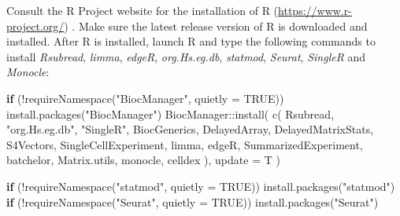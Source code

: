 \documentclass[
  openany]{book}
\newenvironment{Shaded}{\begin{snugshade}}{\end{snugshade}}
\newcommand{\AttributeTok}[1]{\textcolor[rgb]{0.77,0.63,0.00}{#1}}
\newcommand{\ConstantTok}[1]{\textcolor[rgb]{0.00,0.00,0.00}{#1}}
\newcommand{\ControlFlowTok}[1]{\textcolor[rgb]{0.13,0.29,0.53}{\textbf{#1}}}
\newcommand{\FunctionTok}[1]{\textcolor[rgb]{0.00,0.00,0.00}{#1}}
\newcommand{\NormalTok}[1]{#1}
\newcommand{\SpecialCharTok}[1]{\textcolor[rgb]{0.00,0.00,0.00}{#1}}
\newcommand{\StringTok}[1]{\textcolor[rgb]{0.31,0.60,0.02}{#1}}
\begin{document}
Consult the R Project website for the installation of R (\url{https://www.r-project.org/}) \citep{R-base}. Make sure the latest release version of R is downloaded and installed. After R is installed, launch R and type the following commands to install \emph{Rsubread}, \emph{limma}, \emph{edgeR}, \emph{org.Hs.eg.db}, \emph{statmod}, \emph{Seurat}, \emph{SingleR} and \emph{Monocle}:

\begin{Shaded}
\begin{Highlighting}[]
\ControlFlowTok{if}\NormalTok{ (}\SpecialCharTok{!}\FunctionTok{requireNamespace}\NormalTok{(}\StringTok{"BiocManager"}\NormalTok{, }\AttributeTok{quietly =} \ConstantTok{TRUE}\NormalTok{))}
  \FunctionTok{install.packages}\NormalTok{(}\StringTok{"BiocManager"}\NormalTok{)}
\NormalTok{BiocManager}\SpecialCharTok{::}\FunctionTok{install}\NormalTok{(}
  \FunctionTok{c}\NormalTok{(}
    \StringTok{\textquotesingle{}Rsubread\textquotesingle{}}\NormalTok{,}
    \StringTok{"org.Hs.eg.db"}\NormalTok{,}
    \StringTok{"SingleR"}\NormalTok{,}
    \StringTok{\textquotesingle{}BiocGenerics\textquotesingle{}}\NormalTok{,}
    \StringTok{\textquotesingle{}DelayedArray\textquotesingle{}}\NormalTok{,}
    \StringTok{\textquotesingle{}DelayedMatrixStats\textquotesingle{}}\NormalTok{,}
    \StringTok{\textquotesingle{}S4Vectors\textquotesingle{}}\NormalTok{,}
    \StringTok{\textquotesingle{}SingleCellExperiment\textquotesingle{}}\NormalTok{,}
    \StringTok{\textquotesingle{}limma\textquotesingle{}}\NormalTok{,}
    \StringTok{\textquotesingle{}edgeR\textquotesingle{}}\NormalTok{,}
    \StringTok{\textquotesingle{}SummarizedExperiment\textquotesingle{}}\NormalTok{,}
    \StringTok{\textquotesingle{}batchelor\textquotesingle{}}\NormalTok{,}
    \StringTok{\textquotesingle{}Matrix.utils\textquotesingle{}}\NormalTok{,}
    \StringTok{\textquotesingle{}monocle\textquotesingle{}}\NormalTok{,}
    \StringTok{\textquotesingle{}celldex\textquotesingle{}}
\NormalTok{  ),}
  \AttributeTok{update =}\NormalTok{ T}
\NormalTok{)}

\ControlFlowTok{if}\NormalTok{ (}\SpecialCharTok{!}\FunctionTok{requireNamespace}\NormalTok{(}\StringTok{"statmod"}\NormalTok{, }\AttributeTok{quietly =} \ConstantTok{TRUE}\NormalTok{))}
  \FunctionTok{install.packages}\NormalTok{(}\StringTok{"statmod"}\NormalTok{)}
\ControlFlowTok{if}\NormalTok{ (}\SpecialCharTok{!}\FunctionTok{requireNamespace}\NormalTok{(}\StringTok{"Seurat"}\NormalTok{, }\AttributeTok{quietly =} \ConstantTok{TRUE}\NormalTok{))}
  \FunctionTok{install.packages}\NormalTok{(}\StringTok{"Seurat"}\NormalTok{)}
\end{Highlighting}
\end{Shaded}
\end{document}
